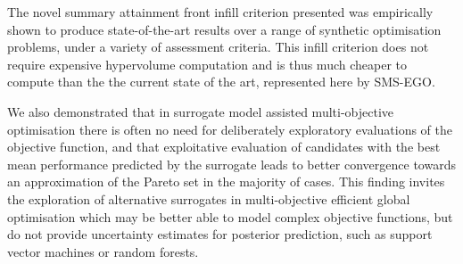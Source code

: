 \documentclass[conference]{IEEEtran}
\newcommand\smsego{SMS-EGO\xspace}
\begin{document}
The  novel summary attainment front infill criterion presented was empirically shown to produce state-of-the-art results over a range of synthetic optimisation problems, under a variety of assessment criteria. This infill criterion does not require expensive hypervolume computation and is thus much cheaper to compute than the the current state of the art, represented here by \smsego. 

We also demonstrated that in surrogate model assisted multi-objective optimisation there is often no need for deliberately exploratory evaluations of the objective function, and that exploitative evaluation of candidates with the best mean performance predicted by the surrogate leads to better convergence towards an approximation of the Pareto set in the majority of cases. This finding invites the exploration of alternative surrogates in multi-objective efficient global optimisation which may be better able to model complex objective functions, but do not provide uncertainty estimates for posterior prediction, such as support vector machines or random forests.




\end{document}
